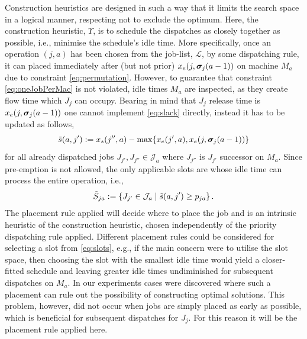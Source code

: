 \documentclass[smallextended]{svjour3}
\begin{document}
Construction heuristics are designed in such a way that it limits the search 
space in a logical manner, respecting not to exclude the optimum. Here, the 
construction heuristic, $\Upsilon$, is to schedule the dispatches as closely 
together as possible, i.e., minimise the schedule's idle time. 
More specifically, once an operation $(j,a)$ has been chosen from the job-list, 
$\mathcal{L}$, by some dispatching rule, it can placed immediately after (but 
not prior) $x_e(j,\bm \sigma_j(a-1))$ on machine $M_a$ due to constraint 
\cref{eq:permutation}. 
However, to guarantee that constraint \cref{eq:oneJobPerMac} is not violated, 
idle times $M_a$ are inspected, as they create flow time  which $J_j$ can 
occupy. Bearing in mind that $J_j$ release time is $x_e(j,\bm \sigma_j(a-1))$ one 
cannot implement \cref{eq:slack} directly, instead it has to be updated as 
follows,
\begin{equation}
\tilde{s}(a,j'):= x_s(j'',a)-\max\{x_e(j',a),x_e(j,\vsigma_j(a-1))\} %
\end{equation}
for all already dispatched jobs $J_{j'},J_{j''}\in \mathcal{J}_a$ where 
$J_{j''}$ is $J_{j'}$ successor on $M_a$. Since pre-emption is not allowed, the 
only applicable slots are whose idle time can process the entire operation, 
i.e.,
\begin{equation}
\tilde{S}_{ja} := \left\{J_{j'}\in \mathcal{J}_a\;\middle|\;\tilde{s}(a,j')\geq p_{ja} 
\right\}\label{eq:slots}.
\end{equation} 
The placement rule applied will decide where to place the job and 
is an intrinsic heuristic of the construction heuristic, chosen independently 
of the priority dispatching rule applied. 
Different placement rules could be considered for selecting a slot from 
\cref{eq:slots}, e.g., if the main concern were to utilise the slot space, then 
choosing the slot with the smallest idle time would yield a closer-fitted 
schedule and leaving greater idle times undiminished for subsequent dispatches 
on $M_a$.
In our experiments cases were discovered where such a placement can rule out 
the possibility of constructing optimal solutions.
This problem, however, did not occur when jobs are simply placed as early as 
possible, which is beneficial for subsequent dispatches for $J_j$. 
For this reason it will be the placement rule applied here.
\end{document}
